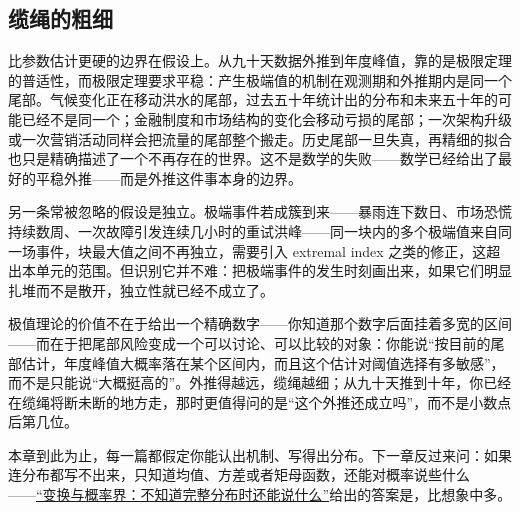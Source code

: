 \subsection{缆绳的粗细}

比参数估计更硬的边界在假设上。从九十天数据外推到年度峰值，靠的是极限定理的普适性，而极限定理要求平稳：产生极端值的机制在观测期和外推期内是同一个尾部。气候变化正在移动洪水的尾部，过去五十年统计出的分布和未来五十年的可能已经不是同一个；金融制度和市场结构的变化会移动亏损的尾部；一次架构升级或一次营销活动同样会把流量的尾部整个搬走。历史尾部一旦失真，再精细的拟合也只是精确描述了一个不再存在的世界。这不是数学的失败——数学已经给出了最好的平稳外推——而是外推这件事本身的边界。

另一条常被忽略的假设是独立。极端事件若成簇到来——暴雨连下数日、市场恐慌持续数周、一次故障引发连续几小时的重试洪峰——同一块内的多个极端值来自同一场事件，块最大值之间不再独立，需要引入 extremal index 之类的修正，这超出本单元的范围。但识别它并不难：把极端事件的发生时刻画出来，如果它们明显扎堆而不是散开，独立性就已经不成立了。

极值理论的价值不在于给出一个精确数字——你知道那个数字后面挂着多宽的区间——而在于把尾部风险变成一个可以讨论、可以比较的对象：你能说``按目前的尾部估计，年度峰值大概率落在某个区间内，而且这个估计对阈值选择有多敏感''，而不是只能说``大概挺高的''。外推得越远，缆绳越细；从九十天推到十年，你已经在缆绳将断未断的地方走，那时更值得问的是``这个外推还成立吗''，而不是小数点后第几位。

本章到此为止，每一篇都假定你能认出机制、写得出分布。下一章反过来问：如果连分布都写不出来，只知道均值、方差或者矩母函数，还能对概率说些什么——\hyperref[ch:043]{``变换与概率界：不知道完整分布时还能说什么''}给出的答案是，比想象中多。
